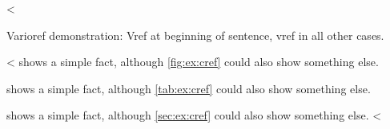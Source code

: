 <%
\label{sec:ex:vref}

Varioref demonstration: Vref at beginning of sentence, vref in all other cases.

<%
 shows a simple fact, although \vref{fig:ex:cref} could also show something else.

 shows a simple fact, although \vref{tab:ex:cref} could also show something else.

 shows a simple fact, although \vref{sec:ex:cref} could also show something else.
<%
